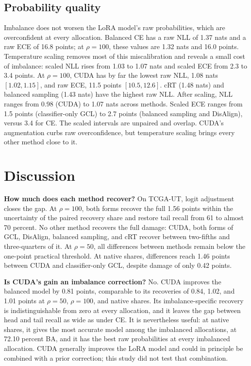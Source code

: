 \subsection{Probability quality}
Imbalance does not worsen the LoRA model's raw probabilities, which are overconfident at every allocation. Balanced CE has a raw NLL of 1.37 nats and a raw ECE of 16.8 points; at $\rho=100$, these values are 1.32 nats and 16.0 points. Temperature scaling removes most of this miscalibration and reveals a small cost of imbalance: scaled NLL rises from 1.03 to 1.07 nats and scaled ECE from 2.3 to 3.4 points. At $\rho=100$, CUDA has by far the lowest raw NLL, 1.08 nats $[1.02, 1.15]$, and raw ECE, 11.5 points $[10.5, 12.6]$. cRT (1.48 nats) and balanced sampling (1.43 nats) have the highest raw NLL. After scaling, NLL ranges from 0.98 (CUDA) to 1.07 nats across methods. Scaled ECE ranges from 1.5 points (classifier-only GCL) to 2.7 points (balanced sampling and DisAlign), versus 3.4 for CE. The scaled intervals are unpaired and overlap. CUDA's augmentation curbs raw overconfidence, but temperature scaling brings every other method close to it.

\section{Discussion}
\label{sec:discussion}
\textbf{How much does each method recover?} On TCGA-UT, logit adjustment closes the gap. At $\rho=100$, both forms recover the full 1.56 points within the uncertainty of the paired recovery share and restore tail recall from 61 to almost 70 percent. No other method recovers the full damage: CUDA, both forms of GCL, DisAlign, balanced sampling, and cRT recover between two-fifths and three-quarters of it. At $\rho=50$, all differences between methods remain below the one-point practical threshold. At native shares, differences reach 1.46 points between CUDA and classifier-only GCL, despite damage of only 0.42 points.

\textbf{Is CUDA's gain an imbalance correction?} No. CUDA improves the balanced model by 0.81 points, comparable to its recoveries of 0.84, 1.02, and 1.01 points at $\rho=50$, $\rho=100$, and native shares. Its imbalance-specific recovery is indistinguishable from zero at every allocation, and it leaves the gap between head and tail recall as wide as under CE. It is nevertheless useful: at native shares, it gives the most accurate model among the imbalanced allocations, at 72.10 percent BA, and it has the best raw probabilities at every imbalanced allocation. CUDA generally improves the LoRA model and could in principle be combined with a prior correction; this study did not test that combination.

